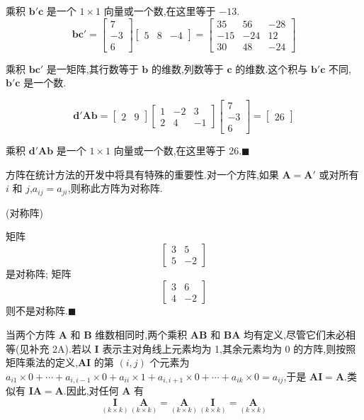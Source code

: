 
乘积 $\bm{b}'\bm{c}$ 是一个 $1\times 1$ 向量或一个数,在这里等于 $-13$.
\[
\bm{b}\bm{c}' =
\begin{bmatrix}
7 \\
-3 \\
6
\end{bmatrix}
\begin{bmatrix}
5 & 8 & -4
\end{bmatrix}
=
\begin{bmatrix}
35 & 56 & -28 \\
-15 & -24 & 12 \\
30 & 48 & -24
\end{bmatrix}
\]

乘积 $\bm{b}\bm{c}'$ 是一矩阵,其行数等于 $\bm{b}$ 的维数,列数等于 $\bm{c}$ 的维数.这个积与 $\bm{b}'\bm{c}$ 不同,$\bm{b}'\bm{c}$ 是一个数.

\[
\bm{d}'\bm{A}\bm{b} =
\begin{bmatrix}
2 & 9
\end{bmatrix}
\begin{bmatrix}
1 & -2 & 3 \\
2 & 4 & -1
\end{bmatrix}
\begin{bmatrix}
7 \\
-3 \\
6
\end{bmatrix}
=
\begin{bmatrix}
26
\end{bmatrix}
\]

乘积 $\bm{d}'\bm{A}\bm{b}$ 是一个 $1\times 1$ 向量或一个数,在这里等于 26.\hfill$\blacksquare$

方阵在统计方法的开发中将具有特殊的重要性.对一个方阵,如果 $\bm{A}=\bm{A}'$ 或对所有 $i$ 和 $j$,$a_{ij}=a_{ji}$,则称此方阵为对称阵.

\quad (对称阵)

矩阵
\[
\begin{bmatrix}
3 & 5 \\
5 & -2
\end{bmatrix}
\]
是对称阵; 矩阵
\[
\begin{bmatrix}
3 & 6 \\
4 & -2
\end{bmatrix}
\]
则不是对称阵.\hfill$\blacksquare$

当两个方阵 $\bm{A}$ 和 $\bm{B}$ 维数相同时,两个乘积 $\bm{A}\bm{B}$ 和 $\bm{B}\bm{A}$ 均有定义,尽管它们未必相等(见补充 2A).若以 $\bm{I}$ 表示主对角线上元素均为 1,其余元素均为 0 的方阵,则按照矩阵乘法的定义,$\bm{A}\bm{I}$ 的第 $(i,j)$ 个元素为 $a_{i1}\times 0+\cdots+a_{i,i-1}\times 0+a_{ii}\times 1+a_{i,i+1}\times 0+\cdots+a_{ik}\times 0=a_{ij}$,于是 $\bm{A}\bm{I}=\bm{A}$.类似有 $\bm{I}\bm{A}=\bm{A}$.因此,对任何 $\bm{A}$ 有
\label{eq:2-11}
\begin{equation}
\underset{(k\times k)}{\bm{I}}\,\underset{(k\times k)}{\bm{A}} = \underset{(k\times k)}{\bm{A}}\,\underset{(k\times k)}{\bm{I}} = \underset{(k\times k)}{\bm{A}} \tag{2-11}
\end{equation}

